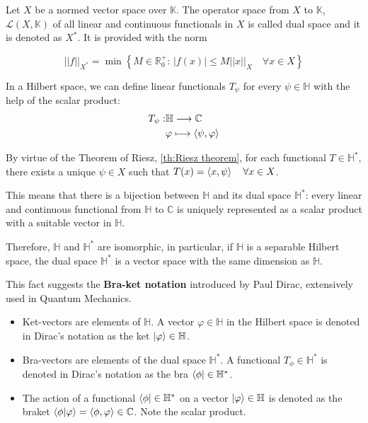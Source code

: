 \begin{definicion}
    Let $X$ be a normed vector space over $\mathbb{K}$. The operator space from $X$ to $\mathbb{K}$, $\mathcal{L}(X,\mathbb{K})$ of all linear and continuous functionals in $X$ is called dual space and it is denoted as $X^{*}$. It is provided with the norm
    
    $$||f||_{X^{*}} = \min \left \lbrace M \in \mathbb{R}_0^{+} :\, |f(x)| \leq M||x||_{X} \quad \forall x \in X \right\rbrace$$
\end{definicion}


In a Hilbert space, we can define linear functionals $T_{\psi}$ for every $\psi \in \mathbb{H}$ with the help of the scalar product:
\begin{align}
    T_{\psi}: &\mathbb{H} \longrightarrow \mathbb{C} \\
    &\varphi \longmapsto \braket{\psi, \varphi}
\end{align}

By virtue of the Theorem of Riesz,  \autoref{th:Riesz theorem}, for each functional $T \in \mathbb{H}^{*}$, there exists a unique $\psi \in X$ such that $T(x)=\braket{x,\psi}\quad \forall x \in X$. 

This means that there is a bijection between $\mathbb{H}$ and its dual space $\mathbb{H}^{*}$: every linear and continuous functional from $\mathbb{H}$ to $\mathbb{C}$ is uniquely represented as a scalar product with a suitable vector in $\mathbb{H}$.

Therefore, $\mathbb{H}$ and $\mathbb{H}^{*}$ are isomorphic, in particular, if $\mathbb{H}$ is a separable Hilbert space, the dual space $\mathbb{H}^{*}$ is a vector space with the same dimension as $\mathbb{H}$.

This fact suggests the \textbf{Bra-ket notation} introduced by Paul Dirac, extensively used in Quantum Mechanics.
\begin{itemize}
    \item Ket-vectors are elements of $\mathbb{H}$. A vector $\varphi \in \mathbb{H}$ in the Hilbert space is denoted in Dirac's notation as the ket $\ket{\varphi} \in \mathbb{H}$.

    \item Bra-vectors are elements of the dual space $\mathbb{H}^{*}$. A functional $T_{\phi} \in \mathbb{H}^{*}$ is denoted in Dirac's notation as the bra $\bra{\phi} \in \mathbb{H}^{*}$.

    \item The action of a functional $\bra{\phi} \in \mathbb{H}^{*}$ on a vector $\ket{\varphi} \in \mathbb{H}$ is denoted as the braket $\braket{\phi | \varphi} = \braket{\phi, \varphi} \in \mathbb{C}$. Note the scalar product.
\end{itemize}

